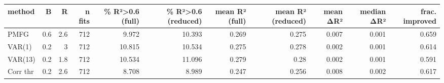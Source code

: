 \begin{tabular}{lrrrrrrrrrr}
\toprule
method & B & R & n fits & \% R²>0.6 (full) & \% R²>0.6 (reduced) & mean R² (full) & mean R² (reduced) & mean ΔR² & median ΔR² & frac. improved \\
\midrule
PMFG & 0.6 & 2.6 & 712 & 9.972 & 10.393 & 0.269 & 0.275 & 0.007 & 0.001 & 0.659 \\
VAR(1) & 0.2 & 3 & 712 & 10.815 & 10.534 & 0.275 & 0.278 & 0.002 & 0.001 & 0.614 \\
VAR(13) & 0.2 & 1.8 & 712 & 10.534 & 11.096 & 0.279 & 0.28 & 0.002 & 0.001 & 0.591 \\
Corr thr & 0.2 & 2.6 & 712 & 8.708 & 8.989 & 0.247 & 0.256 & 0.008 & 0.002 & 0.617 \\
\bottomrule
\end{tabular}
